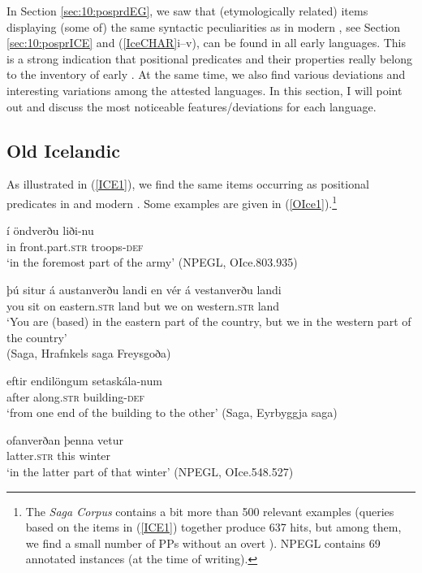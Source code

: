 \documentclass[output=paper,colorlinks,citecolor=brown]{langscibook}
\begin{document}
In Section \ref{sec:10:posprdEG}, we saw that (etymologically related) items displaying (some of) the same syntactic peculiarities as in modern , see Section \ref{sec:10:posprICE} and (\ref{IceCHAR}i--v), can be found in all early  languages. This is a strong indication that positional predicates  and their properties really belong to the inventory of early  . At the same time, we also find various deviations and interesting variations among the attested languages. In this section, I will point out and discuss the most noticeable features/deviations for each language.


\subsection{Old Icelandic}
\label{sec:10:nors}

As illustrated in (\ref{ICE1}), we find the same items occurring as positional predicates in  and modern . Some examples are given in (\ref{OIce1}).\footnote{\label{fnoic}The \textit{Saga Corpus} contains a bit more than 500 relevant examples (queries based on the items in (\ref{ICE1}) together produce 637 hits, but among them, we find  a small number of PPs without an overt ).   NPEGL contains 69 annotated instances (at the time of writing). }

\begin{exe}
   \ex \label{OIce1} 
      \begin{xlist}
        \ex \gll í öndverðu liði-nu    \\ 
          in front.part.\textsc{str} troops-\textsc{def}   \\   
           \glt `in the foremost part of the army' (NPEGL, OIce.803.935)

         \ex \gll  þú situr á austanverðu landi en vér á vestanverðu landi \\ 
            you sit on eastern.\textsc{str} land but we on western.\textsc{str} land   \\  
             \glt `You are (based) in the eastern part of the country, but we in the  western part of the country' \\ (Saga, Hrafnkels saga Freysgoða)
 
         \ex \gll eftir endilöngum setaskála-num   \\ 
           after along.\textsc{str} building-\textsc{def}  \\   
          \glt  `from one end of the building to the other' (Saga, Eyrbyggja saga)

      \ex \gll ofanverðan þenna vetur   \\ 
         latter.\textsc{str} this winter \\  
         \glt `in the latter part of that winter' (NPEGL, OIce.548.527)
    \end{xlist}
\end{exe} 
\end{document}
